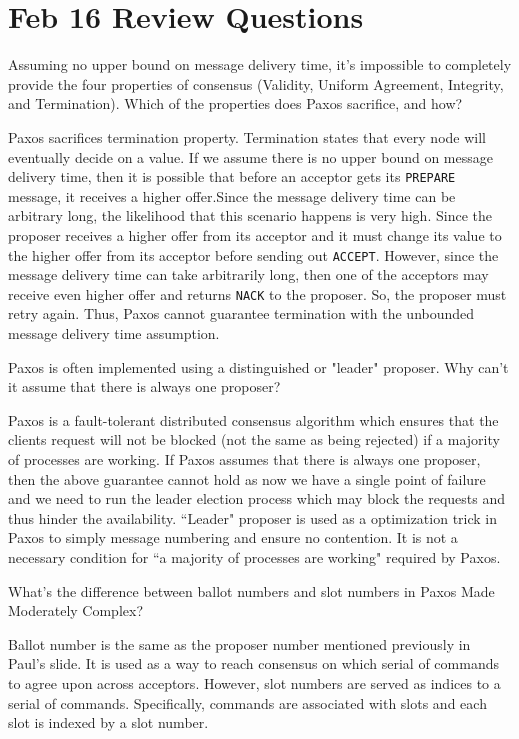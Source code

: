 \section{Feb 16 Review Questions}
\begin{QandA}
   \item Assuming no upper bound on message delivery time, it's impossible to completely provide the four properties of consensus (Validity, Uniform Agreement, Integrity, and Termination). Which of the properties does Paxos sacrifice, and how?
         \begin{answered}
		 Paxos sacrifices termination property. Termination states that every node will eventually decide on a value. If we assume there is no
		 upper bound on message delivery time, then it is possible that before an acceptor gets its \texttt{PREPARE} message, it receives a higher 
		 offer.Since the message delivery time can be arbitrary long, the likelihood that this scenario happens is very high. Since the proposer 
		 receives a higher offer from its acceptor and it must change its value to the higher offer from its acceptor before sending out 
		 \texttt{ACCEPT}. However, since the message delivery time can take arbitrarily long, then one of the acceptors may receive even higher offer 
		 and returns \texttt{NACK} to the proposer. So, the proposer must retry again. Thus, Paxos cannot guarantee termination with the unbounded 
		 message delivery time assumption.
         \end{answered}

   \item Paxos is often implemented using a distinguished or "leader" proposer. Why can't it assume that there is always one proposer?
         \begin{answered}
		 Paxos is a fault-tolerant distributed consensus algorithm which ensures that the clients request will not be blocked (not the same
		 as being rejected) if a majority of processes are working. If Paxos assumes that there is always one proposer, then the above guarantee
		 cannot hold as now we have a single point of failure and we need to run the leader election process which may block the requests and
		 thus hinder the availability. ``Leader"
		 proposer is used as a optimization trick in Paxos to simply message numbering and ensure no contention. It is not a necessary condition
		 for ``a majority of processes are working" required by Paxos. 
         \end{answered}
         
   \item What's the difference between ballot numbers and slot numbers in Paxos Made Moderately Complex?
         \begin{answered}
         Ballot number is the same as the proposer number mentioned previously in Paul's slide. It is used as a way to reach consensus on 
         which serial of commands to agree upon across acceptors. However, slot numbers are served as indices to a serial of commands. Specifically, commands are associated with slots and each slot is indexed by a slot number. 
         \end{answered}
\end{QandA}




